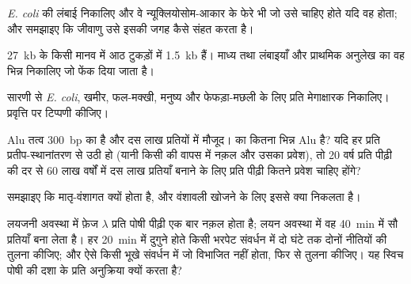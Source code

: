 \begin{exercise}[$\star\star$]\label{exo:b1:genomes:5}
\emph{E. coli}  की लंबाई निकालिए और वे न्यूक्लियोसोम-आकार के फेरे
भी जो उसे चाहिए होते यदि वह  होता; और समझाइए कि जीवाणु उसे
इसकी जगह कैसे संहत करता है।
\end{exercise}

\begin{exercise}[$\star\star$]\label{exo:b1:genomes:6}
\qty{27}{kb} के किसी मानव  में आठ टुकड़ों में \qty{1.5}{kb} 
हैं। माध्य  तथा  लंबाइयाँ और प्राथमिक अनुलेख का वह भिन्न
निकालिए जो फेंक दिया जाता है।
\end{exercise}

\begin{exercise}[$\star\star$]\label{exo:b1:genomes:7}
सारणी से \emph{E. coli}, खमीर, फल-मक्खी, मनुष्य और फेफड़ा-मछली के लिए
प्रति मेगाक्षारक  निकालिए। प्रवृत्ति पर टिप्पणी कीजिए।
\end{exercise}

\begin{exercise}[$\star\star$]\label{exo:b1:genomes:8}
Alu तत्व \qty{300}{bp} का है और दस लाख प्रतियों में मौजूद।
 का कितना भिन्न Alu है? यदि हर प्रति प्रतीप-स्थानांतरण से उठी हो
(यानी किसी  की वापस  में नक़ल और उसका प्रवेश), तो
\num{20} वर्ष प्रति पीढ़ी की दर से \num{60} लाख वर्षों में दस लाख
प्रतियाँ बनाने के लिए प्रति पीढ़ी कितने प्रवेश चाहिए होंगे?
\end{exercise}

\begin{exercise}[$\star\star$]\label{exo:b1:genomes:9}
समझाइए कि   मातृ-वंशागत क्यों होता है, और वंशावली खोजने के
लिए इससे क्या निकलता है।
\end{exercise}

\begin{exercise}[$\star\star\star$]\label{exo:b1:genomes:10}
लयजनी अवस्था में फ़ेज $\lambda$ प्रति पोषी पीढ़ी एक बार नक़ल होता है;
लयन अवस्था में वह \qty{40}{min} में सौ प्रतियाँ बना लेता है।
हर \qty{20}{min} में दुगुने होते किसी भरपेट संवर्धन में दो घंटे तक दोनों
नीतियों की तुलना कीजिए; और ऐसे किसी भूखे संवर्धन में जो विभाजित नहीं
होता, फिर से तुलना कीजिए। यह स्विच पोषी की दशा के प्रति अनुक्रिया क्यों
करता है?
\end{exercise}

